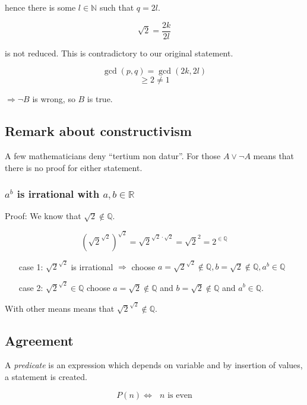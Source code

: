 \documentclass[a4paper,landscape,twocolumn]{article}
\begin{document}
hence there is some $l \in \mathbb{N}$ such that $q = 2l$.

\[ \sqrt{2} = \frac{2k}{2l} \]

is not reduced. This is contradictory to our original statement.

\[ \operatorname{gcd}(p,q) = \operatorname{gcd}(2k, 2l) \]
\[ \geq 2 \neq 1 \]

$\Rightarrow \neg B$ is wrong, so $B$ is true.

\subsection{Remark about constructivism}

A few mathematicians deny \enquote{tertium non datur}.
For those $A \lor \neg A$ means that there is no proof for either statement.

\subsubsection{$a^b$ is irrational with $a, b \in \mathbb{R}$}

Proof: We know that $\sqrt{2} \not\in \mathbb{Q}$.

\[
    \left(\sqrt{2}^{\sqrt{2}}\right)^{\sqrt{2}}
    = \sqrt{2}^{\sqrt{2}\cdot\sqrt{2}}
    = \sqrt{2}^2
    = 2^{\in \mathbb{Q}}
\]

\begin{enumerate}
  \item[case 1:]
    $\sqrt{2}^{\sqrt{2}}$ is irrational
    $\Rightarrow$ choose $a = \sqrt{2}^{\sqrt{2}} \not\in \mathbb{Q},
    b = \sqrt{2} \not\in \mathbb{Q}, a^b \in \mathbb{Q}$
  \item[case 2:]
    $\sqrt{2}^{\sqrt{2}} \in \mathbb{Q}$
    choose $a = \sqrt{2} \not\in \mathbb{Q}$ and $b = \sqrt{2} \not\in \mathbb{Q}$
    and $a^b \in \mathbb{Q}$.
\end{enumerate}

With other means means that $\sqrt{2}^{\sqrt{2}} \not\in \mathbb{Q}$.

\subsection{Agreement}

A \emph{predicate} is an expression which depends on variable and
by insertion of values, a statement is created.

\[ P(n) \Leftrightarrow \text{ $n$ is even} \]
\end{document}
